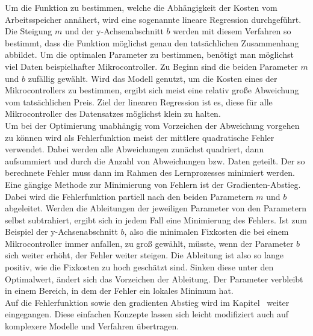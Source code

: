     Um die Funktion zu bestimmen, welche die Abhängigkeit der Kosten vom Arbeitsspeicher annähert, wird eine sogenannte lineare Regression durchgeführt. Die Steigung $m$ und der y-Achsenabschnitt $b$ werden mit diesem Verfahren so bestimmt, dass die Funktion möglichst genau den tatsächlichen Zusammenhang abbildet. Um die optimalen Parameter zu bestimmen, benötigt man möglichst viel Daten beispielhafter Mikrocontroller. Zu Beginn sind die beiden Parameter $m$ und $b$ zufällig gewählt. Wird das Modell genutzt, um die Kosten eines der Mikrocontrollers zu bestimmen, ergibt sich meist eine relativ große Abweichung vom tatsächlichen Preis. Ziel der linearen Regression ist es, diese für alle Mikrocontroller des Datensatzes möglichst klein zu halten\cite{Kossen2019}.\\ Um bei der Optimierung unabhängig vom Vorzeichen der Abweichung vorgehen zu können wird als Fehlerfunktion meist der mittlere quadratische Fehler verwendet. Dabei werden alle Abweichungen zunächst quadriert, dann aufsummiert und durch die Anzahl von Abweichungen bzw. Daten geteilt\cite{James2013-2}. Der so berechnete Fehler muss dann im Rahmen des Lernprozesses minimiert werden. Eine gängige Methode zur Minimierung von Fehlern ist der Gradienten-Abstieg. Dabei wird die Fehlerfunktion partiell nach den beiden Parametern $m$ und $b$ abgeleitet. Werden die Ableitungen der jeweiligen Parameter von den Parametern selbst subtrahiert, ergibt sich in jedem Fall eine Minimierung des Fehlers. Ist zum Beispiel der y-Achsenabschnitt $b$, also die minimalen Fixkosten die bei einem Mikrocontroller immer anfallen, zu groß gewählt, müsste, wenn der Parameter $b$ sich weiter erhöht, der Fehler weiter steigen. Die Ableitung ist also so lange positiv, wie die Fixkosten zu hoch geschätzt sind. Sinken diese unter den Optimalwert, ändert sich das Vorzeichen der Ableitung. Der Parameter verbleibt in einem Bereich, in dem der Fehler ein lokales Minimum hat\cite{Böttcher2019-22}\cite{GradientDescent}.\\ Auf die Fehlerfunktion sowie den gradienten Abstieg wird im Kapitel~ weiter eingegangen. Diese einfachen Konzepte lassen sich leicht modifiziert auch auf komplexere Modelle und Verfahren übertragen. 

